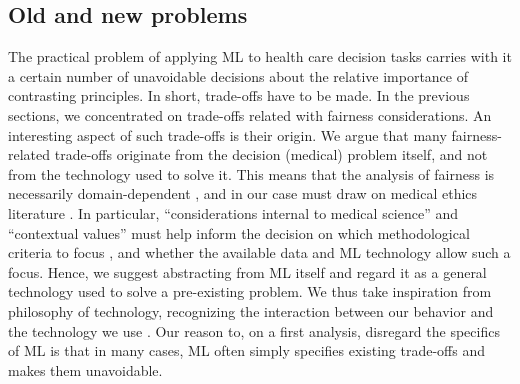 \subsection{Old and new problems}
    The practical problem of applying ML to health care decision tasks carries with it a certain number of unavoidable decisions about the relative importance of contrasting principles.
    In short, trade-offs have to be made.
    In the previous sections, we concentrated on trade-offs related with fairness considerations.
    An interesting aspect of such trade-offs is their origin.
    We argue that many fairness-related trade-offs originate from the decision (medical) problem itself, and not from the technology used to solve it.
    This means that the analysis of fairness is necessarily domain-dependent \cite[p.~5]{Fletcher2021}, and in our case must draw on medical ethics literature \cite[p.~2]{Morley2020}.
    In particular, ``considerations internal to medical science'' and ``contextual values'' must help inform the decision on which methodological criteria to focus \cite[p.~252]{Ho2011}, and whether the available data and ML technology allow such a focus.
    Hence, we suggest abstracting from ML itself and regard it as a general technology used to solve a pre-existing problem.
    We thus take inspiration from philosophy of technology, recognizing the interaction between our behavior and the technology we use \cite{Dijkstra2020}.
    Our reason to, on a first analysis, disregard the specifics of ML is that in many cases, ML often simply specifies existing trade-offs and makes them unavoidable.

